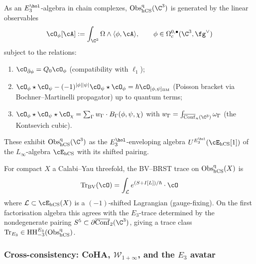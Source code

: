 \begin{corollary}
\label{cor:E3-gens-rels-avatar}
As an $E_3^{\hol}$-algebra in chain complexes, $\mathrm{Obs}^{\mathrm{q}}_{\hCS}(\C^3)$ is generated by the linear observables
\[
\cO_\phi[\cA] := \int_{\C^3} \Omega \wedge \langle \phi, \cA \rangle, \qquad \phi \in \Omega^{0,\bullet}_c(\C^3, \fg^\vee)
\]
subject to the relations:
\begin{enumerate}
\item $\cO_{\bar\partial \phi} = Q_0 \cO_\phi$ (compatibility with $\ell_1$);
\item $\cO_\phi \star \cO_\psi - (-1)^{|\phi||\psi|} \cO_\psi \star \cO_\phi = \hbar \cO_{[\phi, \psi]_{\mathrm{BM}}}$ (Poisson bracket via Bochner--Martinelli propagator) up to quantum terms;
\item $\cO_\phi \star \cO_\psi \star \cO_\chi = \sum_\Gamma w_\Gamma \cdot B_\Gamma(\phi, \psi, \chi)$ with $w_\Gamma = \int_{\overline{\mathrm{Conf}}_n(\C^3)} \omega_\Gamma$ (the Kontsevich cubic).
\end{enumerate}
These exhibit $\mathrm{Obs}^{\mathrm{q}}_{\hCS}(\C^3)$ as the $E_3^{\hol}$-enveloping algebra $U^{E_3^{\hol}}(\cE_{\hCS}[1])$ of the $L_\infty$-algebra $\cE_{\hCS}$ with its shifted pairing.
\end{corollary}

\begin{theorem}
\label{thm:BV-BRST-trace-avatar}
For compact $X$ a Calabi--Yau threefold, the BV--BRST trace on $\mathrm{Obs}^{\mathrm{q}}_{\mathrm{hCS}}(X)$ is
\[
\mathrm{Tr}_{\mathrm{BV}}(\cO) = \int_{\mathcal{L}} e^{(S + I[L])/\hbar} \cdot \cO
\]
where $\mathcal{L} \subset \cE_{\hCS}(X)$ is a $(-1)$-shifted Lagrangian (gauge-fixing). On the first factorisation algebra this agrees with the $E_3$-trace determined by the nondegenerate pairing $S^5 \subset \partial \overline{\mathrm{Conf}}_2(\C^3)$, giving a trace class $\mathrm{Tr}_{E_3} \in \mathrm{HH}_{-3}^{E_3}(\mathrm{Obs}^{\mathrm{q}}_{\mathrm{hCS}})$.
\end{theorem}

\subsubsection{Cross-consistency: CoHA, $\mathcal{W}_{1+\infty}$, and the $E_3$ avatar}
\label{sssec:cross-consistency-CoHA-W-E3}

